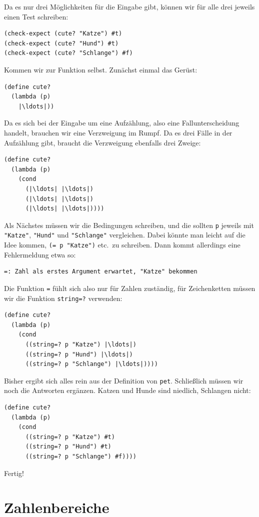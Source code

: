 Da es nur drei Möglichkeiten für die Eingabe gibt, können wir für alle
drei jeweils einen Test schreiben:
%
\begin{lstlisting}
(check-expect (cute? "Katze") #t)
(check-expect (cute? "Hund") #t)
(check-expect (cute? "Schlange") #f)
\end{lstlisting}
%
Kommen wir zur Funktion selbst.  Zunächst einmal das Gerüst:
%
\begin{lstlisting}
(define cute?
  (lambda (p)
    |\ldots|))
\end{lstlisting}
%
Da es sich bei der Eingabe um eine Aufzählung, also eine
Fallunterscheidung handelt, brauchen wir eine Verzweigung im Rumpf.  Da
es drei Fälle in der Aufzählung gibt, braucht die Verzweigung
ebenfalls drei Zweige:
%
\begin{lstlisting}
(define cute?
  (lambda (p)
    (cond
      (|\ldots| |\ldots|)
      (|\ldots| |\ldots|)
      (|\ldots| |\ldots|))))
\end{lstlisting}
%
Als Nächstes müssen wir die Bedingungen schreiben, und die sollten
\lstinline{p} jeweils mit \lstinline{"Katze"}, \lstinline{"Hund"} und
\lstinline{"Schlange"} vergleichen.  Dabei könnte man leicht auf die Idee
kommen, \lstinline{(= p "Katze")} etc.\ zu schreiben.  Dann kommt
allerdings eine Fehlermeldung etwa so:
%
\begin{lstlisting}
=: Zahl als erstes Argument erwartet, "Katze" bekommen
\end{lstlisting}
%
Die Funktion \lstinline{=} fühlt sich also nur für Zahlen zuständig, für
Zeichenketten müssen wir die Funktion
\lstinline{string=?} verwenden:
%
\begin{lstlisting}
(define cute?
  (lambda (p)
    (cond
      ((string=? p "Katze") |\ldots|)
      ((string=? p "Hund") |\ldots|)
      ((string=? p "Schlange") |\ldots|))))
\end{lstlisting}
%
Bisher ergibt sich alles rein aus der Definition von \lstinline{pet}.
Schließlich müssen wir noch die Antworten ergänzen.  Katzen und Hunde
sind niedlich, Schlangen nicht:
%
\begin{lstlisting}
(define cute?
  (lambda (p)
    (cond
      ((string=? p "Katze") #t)
      ((string=? p "Hund") #t)
      ((string=? p "Schlange") #f))))
\end{lstlisting}
%
Fertig!

\section{Zahlenbereiche}
\label{sec:zahlenbereiche}
\label{sec:heat-water}


